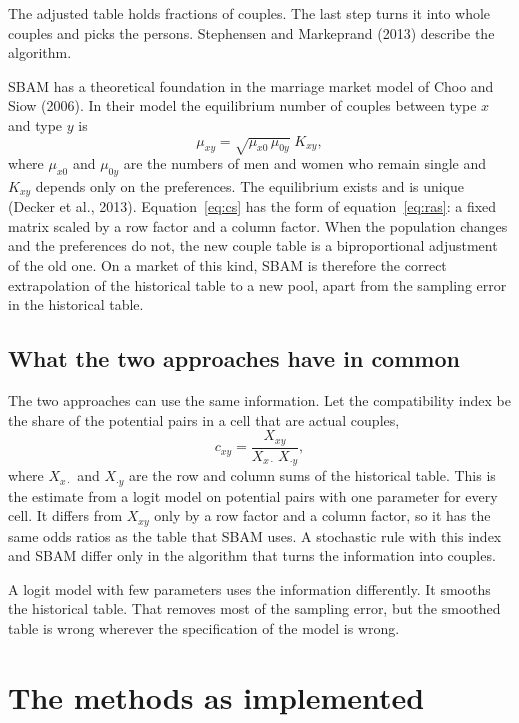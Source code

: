 \documentclass[12pt,a4paper]{article}
\begin{document}
The adjusted table holds fractions of couples. The last step turns it into whole couples and
picks the persons. Stephensen and Markeprand (2013) describe the algorithm.

SBAM has a theoretical foundation in the marriage market model of Choo and Siow (2006). In their
model the equilibrium number of couples between type $x$ and type $y$ is
\begin{equation}
\mu_{xy} = \sqrt{\mu_{x0}\,\mu_{0y}}\; K_{xy},
\label{eq:cs}
\end{equation}
where $\mu_{x0}$ and $\mu_{0y}$ are the numbers of men and women who remain single and $K_{xy}$
depends only on the preferences. The equilibrium exists and is unique (Decker et al., 2013).
Equation~\eqref{eq:cs} has the form of equation~\eqref{eq:ras}: a fixed matrix scaled by a row
factor and a column factor. When the population changes and the preferences do not, the new
couple table is a biproportional adjustment of the old one. On a market of this kind, SBAM is
therefore the correct extrapolation of the historical table to a new pool, apart from the
sampling error in the historical table.

\subsection{What the two approaches have in common}

The two approaches can use the same information. Let the compatibility index be the share of the
potential pairs in a cell that are actual couples,
\begin{equation}
c_{xy} = \frac{X_{xy}}{X_{x\cdot}\,X_{\cdot y}},
\label{eq:tableindex}
\end{equation}
where $X_{x\cdot}$ and $X_{\cdot y}$ are the row and column sums of the historical table. This is
the estimate from a logit model on potential pairs with one parameter for every cell. It
differs from $X_{xy}$ only by a row factor and a column factor, so it has the same odds ratios as
the table that SBAM uses. A stochastic rule with this index and SBAM differ only in the algorithm
that turns the information into couples.

A logit model with few parameters uses the information differently. It smooths the historical
table. That removes most of the sampling error, but the smoothed table is wrong wherever the
specification of the model is wrong.

\section{The methods as implemented}\label{sec:impl}
\end{document}
